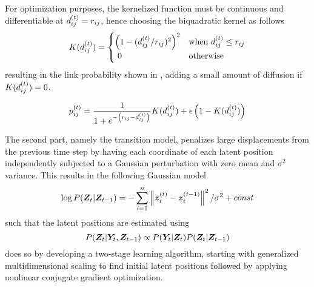     For optimization purposes, the kernelized function must be continuous and differentiable at $\sub(d)^\t=\sub(r)$, hence choosing the biquadratic kernel as follows
    \begin{equation}\label{eq:biquadratic-kernel}
        K(\sub(d)^\t)=
        \begin{cases}
            \left(1-(\sub(d)^\t/\sub(r))^2\right)^2 & \text{when } \sub(d)^\t \leq \sub(r) \\
            \ 0 & \text{otherwise}
        \end{cases}
    \end{equation}
    resulting in the link probability shown in , adding a small amount of diffusion if $K(\sub(d)^\t)=0$.
    
    \begin{equation}\label{eq:dsnl-proba}
        \sub(p)^\t=\frac{1}{1 + e^{-\left(\sub(r)-\sub(d)^\t\right)}} K(\sub(d)^\t) + \epsilon\left(1-K(\sub(d)^\t)\right)
    \end{equation}
    
    The second part, namely the transition model, penalizes large displacements from the previous time step by having each coordinate of each latent position independently subjected to a Gaussian perturbation with zero mean and $\sigma^2$ variance. This results in the following Gaussian model
    \begin{equation}\label{eq:dsnl-transition}
        \log P(\bm{Z}_t|\bm{Z}_{t-1}) = -\sum_{i=1}^n \left\Vert\bm{z}_i^{(t)}-\bm{z}_i^{(t-1)}\right\Vert^2 / \sigma^2 + const
    \end{equation}
    such that the latent positions are estimated using
    \begin{equation}
        P(\bm{Z}_t|\bm{Y}_t,\bm{Z}_{t-1})\propto P(\bm{Y}_t|\bm{Z}_t)P(\bm{Z}_t|\bm{Z}_{t-1})
    \end{equation}
    \citeauthor*{sarkar2005dynamic} does so by developing a two-stage learning algorithm, starting with generalized multidimensional scaling to find initial latent positions followed by applying nonlinear conjugate gradient optimization.
    
